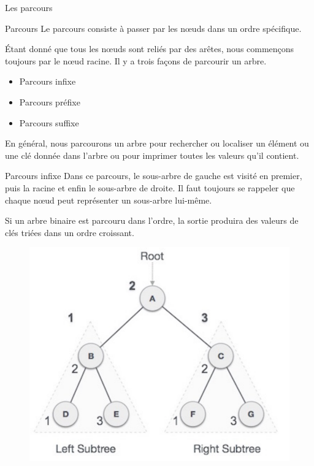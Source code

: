 \documentclass[10pt,xcolor=dvipsnames]{beamer}
\newcommand{\defin}[1]{\textcolor{darkspringgreen}{#1}}
\begin{document}
\begin{frame}{Les parcours}
        \begin{exampleblock}{Parcours}
    Le \defin{parcours} consiste à passer par les nœuds dans un ordre spécifique.
    \end{exampleblock}
    
    Étant donné que tous les nœuds sont reliés par des arêtes, nous commençons toujours par le nœud racine. Il y a trois façons de parcourir un arbre.

\begin{itemize}
    \item Parcours infixe
    \item Parcours préfixe
    \item Parcours suffixe
\end{itemize}

En général, nous parcourons un arbre pour rechercher ou localiser un élément ou une clé donnée dans l'arbre ou pour imprimer toutes les valeurs qu'il contient.
\end{frame}

\begin{frame}{Parcours infixe}
    Dans ce \alert{parcours}, le sous-arbre de gauche est visité en premier, puis la racine et enfin le sous-arbre de droite. Il faut toujours se rappeler que chaque nœud peut représenter un sous-arbre lui-même.

Si un arbre binaire est parcouru dans l'ordre, la sortie produira des valeurs de clés triées dans un ordre croissant.

\begin{figure}
    \centering
    \includegraphics[scale=0.2]{figures/CM2/ABR-infix.png}
    \label{fig:my_label}
\end{figure}
\end{frame}
\end{document}
